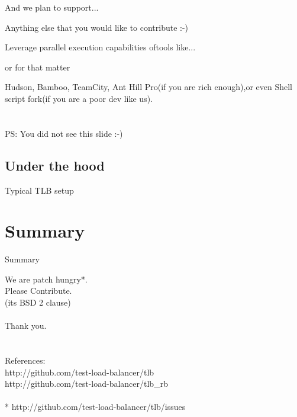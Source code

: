 \documentclass{beamer}
\begin{document}
\begin{frame}{And we plan to support...}
  \begin{center}
    Anything else that you would like to contribute :-)
  \end{center}
\end{frame}

\begin{frame}{Leverage parallel execution capabilities of}{tools like...}
  \begin{center}
  \end{center}
\end{frame}

\begin{frame}{or for that matter}
  \begin{center}
    {\huge Hudson, Bamboo, TeamCity, Ant Hill Pro}(if you are rich enough),{\huge or even Shell script fork}(if you are a poor dev like us).\\
    \quad\\\quad\\
    {\footnotesize PS: You did not see this slide :-)}
  \end{center}
\end{frame}

\subsection{Under the hood}

\begin{frame}{Typical TLB setup}
  \begin{centering}
  \end{centering}
\end{frame}

\section*{Summary}

\begin{frame}{Summary}{}
  \begin{centering}
  {\huge We are patch hungry*.\\Please Contribute.\\}
  (its BSD 2 clause)\\
  \quad\\
  {\huge Thank you.}\\
  \quad\\
  \quad\\
  References:\\
  http://github.com/test-load-balancer/tlb\\
  http://github.com/test-load-balancer/tlb\_rb\\
  \quad\\
  * http://github.com/test-load-balancer/tlb/issues\\
  \end{centering}
\end{frame}
\end{document}
